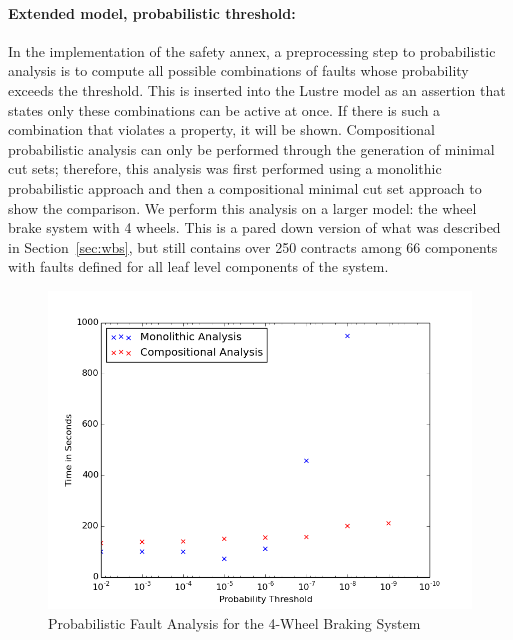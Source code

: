 \paragraph{Extended model, probabilistic threshold:} In the implementation of the safety annex, a preprocessing step to probabilistic analysis is to compute all possible combinations of faults whose probability exceeds the threshold. This is inserted into the Lustre model as an assertion that states only these combinations can be active at once. If there is such a combination that violates a property, it will be shown. Compositional probabilistic analysis can only be performed through the generation of minimal cut sets; therefore, this analysis was first performed using a monolithic probabilistic approach and then a compositional minimal cut set approach to show the comparison. We perform this analysis on a larger model: the wheel brake system with 4 wheels. This is a pared down version of what was described in Section~\ref{sec:wbs}, but still contains over 250 contracts among 66 components with faults defined for all leaf level components of the system. 

\begin{figure}[htbp]
	\begin{center}
		\includegraphics[width=.7\textwidth]{images/graphProbWBS_4wheel.png}
	\end{center}
	\vspace{-0.3in}
	\caption{Probabilistic Fault Analysis for the 4-Wheel Braking System}
	\label{fig:graphProbWBS_4wheel}
\end{figure}

